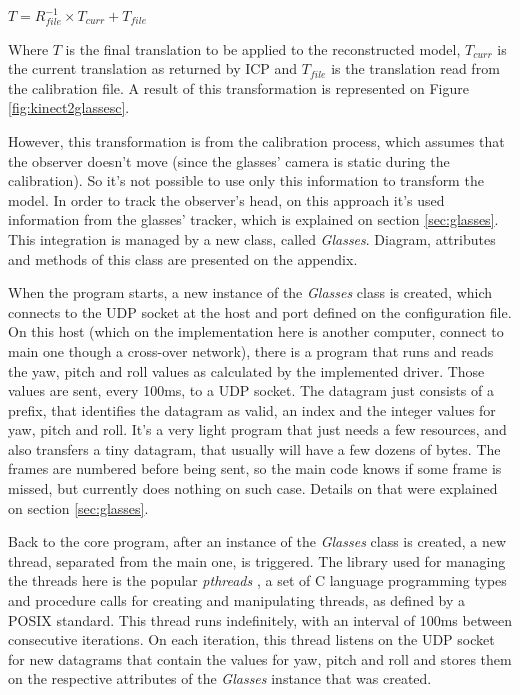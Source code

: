 \documentclass[msc, a4paper, classic, en]{ufbathesis}
\begin{document}
\begin{center}
$T = R_{file}^{-1} \times T_{curr} + T_{file}$
\end{center}

Where $T$ is the final translation to be applied to the reconstructed model, $T_{curr}$ is the current translation as returned by ICP and $T_{file}$ is the translation read from the calibration file. A result of this transformation is represented on Figure \ref{fig:kinect2glassesc}.

However, this transformation is from the calibration process, which assumes that the observer doesn't move (since the glasses' camera is static during the calibration). So it's not possible to use only this information to transform the model. In order to track the observer's head, on this approach it's used information from the glasses' tracker, which is explained on section \ref{sec:glasses}. This integration is managed by a new class, called \textit{Glasses}. Diagram, attributes and methods of this class are presented on the appendix.

When the program starts, a new instance of the \textit{Glasses} class is created, which connects to the UDP socket at the host and port defined on the configuration file. On this host (which on the implementation here is another computer, connect to main one though a cross-over network), there is a program that runs and reads the yaw, pitch and roll values as calculated by the implemented driver. Those values are sent, every 100ms, to a UDP socket. The datagram just consists of a prefix, that identifies the datagram as valid, an index and the integer values for yaw, pitch and roll. It's a very light program that just needs a few resources, and also transfers a tiny datagram, that usually will have a few dozens of bytes. The frames are numbered before being sent, so the main code knows if some frame is missed, but currently does nothing on such case. Details on that were explained on section \ref{sec:glasses}.

Back to the core program, after an instance of the \textit{Glasses} class is created, a new thread, separated from the main one, is triggered. The library used for managing the threads here is the popular \textit{pthreads} \cite{pthreads}, a set of C language programming types and procedure calls for creating and manipulating threads, as defined by a POSIX standard. This thread runs indefinitely, with an interval of 100ms between consecutive iterations. On each iteration, this thread listens on the UDP socket for new datagrams that contain the values for yaw, pitch and roll and stores them on the respective attributes of the \textit{Glasses} instance that was created.
\end{document}
